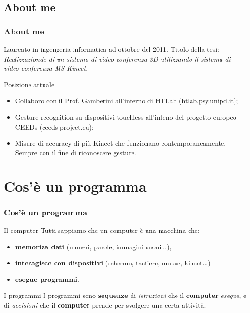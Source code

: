 \subsection{About me}
\begin{frame}
\frametitle{About me}
\begin{block}{}
Laureato in ingengeria informatica ad ottobre del 2011. Titolo della
tesi: \textit{Realizzazionde di un sistema di video conferenza 3D utilizzando 
il sistema di video conferenza MS Kinect}.
\end{block}

\begin{block}{Posizione attuale}
\begin{itemize}
\item Collaboro con il Prof. Gamberini all'interno di HTLab (htlab.psy.unipd.it);
\item Gesture recognition su dispositivi touchless all'inteno del progetto europeo
CEEDs (ceeds-project.eu);
\item Misure di accuracy di più Kinect che funzionano contemporaneamente. Sempre con 
il fine di riconoscere gesture.
\end{itemize}
\end{block}
\end{frame}

\section{Cos'è un programma}
\begin{frame}
\frametitle{Cos'è un programma}
\begin{block}{Il computer}
Tutti sappiamo che un computer è una macchina che: 
\begin{itemize}
\item \textbf{memoriza dati} (numeri, parole, immagini suoni...);
\item \textbf{interagisce con dispositivi} (schermo, tastiere, mouse, kinect...)
\item \textbf{esegue programmi}.
\end{itemize}
\end{block}
\pause
\begin{block}{I programmi}
I programmi sono \textbf{sequenze} di \textit{istruzioni} che il \textbf{computer}
\textit{esegue}, e di \textit{decisioni} che il \textbf{computer} prende per svolgere
una certa attività.
\end{block}
\end{frame}

